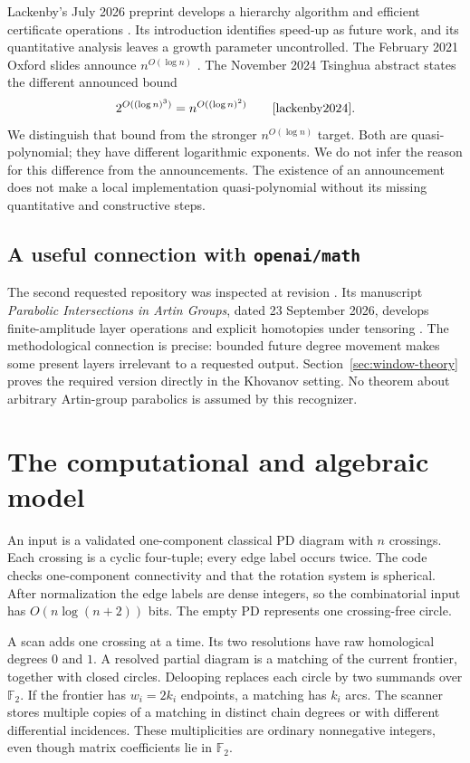 \documentclass[11pt,letterpaper]{article}
\theoremstyle{definition}
\theoremstyle{remark}
\newcommand{\F}{\mathbb F_2}
\begin{document}
Lackenby's July 2026 preprint develops a hierarchy algorithm and efficient
certificate operations \cite{lackenby2026}.  Its introduction identifies
speed-up as future work, and its quantitative analysis leaves a growth
parameter uncontrolled.  The February 2021 Oxford slides announce
$n^{O(\log n)}$ \cite{lackenbytalk}.  The November 2024
Tsinghua abstract states the different announced bound
\[
 2^{O((\log n)^3)}=n^{O((\log n)^2)}
 \qquad\cite{lackenby2024}.
\]
We distinguish that bound from the stronger $n^{O(\log n)}$ target.
Both are quasi-polynomial; they have different logarithmic exponents.
We do not infer the reason for this difference from the announcements.
The existence of an announcement does not make a local implementation
quasi-polynomial without its missing quantitative and constructive steps.

\subsection{A useful connection with \texttt{openai/math}}

The second requested repository was inspected at revision
.
Its manuscript \emph{Parabolic Intersections in Artin Groups}, dated
23 September 2026, develops finite-amplitude layer operations and explicit
homotopies under tensoring \cite{openai_artin}.  The methodological
connection is precise: bounded future degree movement makes some present
layers irrelevant to a requested output.  Section~\ref{sec:window-theory}
proves the required version directly in the Khovanov setting.  No theorem
about arbitrary Artin-group parabolics is assumed by this recognizer.

\section{The computational and algebraic model}
\label{sec:model}

An input is a validated one-component classical PD diagram with $n$
crossings.  Each crossing is a cyclic four-tuple; every edge label occurs
twice.  The code checks one-component connectivity and that the rotation
system is spherical.  After normalization the edge labels are dense
integers, so the combinatorial input has $O(n\log(n+2))$ bits.  The empty
PD represents one crossing-free circle.

A scan adds one crossing at a time.  Its two resolutions have raw
homological degrees $0$ and $1$.  A resolved partial diagram is a matching
of the current frontier, together with closed circles.  Delooping replaces
each circle by two summands over $\F$.  If the frontier has $w_i=2k_i$
endpoints, a matching has $k_i$ arcs.  The scanner stores multiple copies
of a matching in distinct chain degrees or with different differential
incidences.  These multiplicities are ordinary nonnegative integers,
even though matrix coefficients lie in $\F$.
\end{document}
